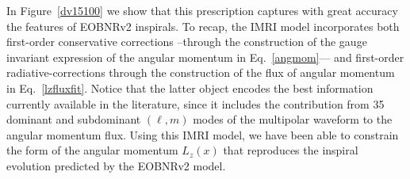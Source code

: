 In Figure~\ref{dv15100} we show that this prescription captures with great accuracy the features of EOBNRv2  inspirals. To recap,  the IMRI model incorporates both first-order conservative corrections --through  the construction of the gauge invariant expression of the angular momentum in  Eq.~\eqref{angmom}--- and first-order radiative-corrections through the construction of the flux of angular momentum in Eq.~\eqref{lzfluxfit}. Notice that the latter object encodes the best information currently available in the literature, since it includes the contribution from 35 dominant and subdominant \((\ell,m)\) modes of the multipolar waveform to the angular momentum flux. Using this IMRI model, we have been able to constrain the form of the angular momentum \(L_z(x)\) that reproduces the inspiral evolution predicted by the EOBNRv2 model.

